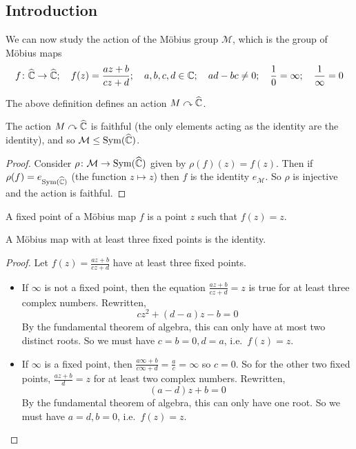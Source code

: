\subsection{Introduction}
We can now study the action of the M\"obius group \(\mathcal M\), which is the group of M\"obius maps
\[
	f\colon \widehat{\mathbb C} \to \widehat{\mathbb C};\quad f(z) = \frac{az+b}{cz+d};\quad a,b,c,d\in\mathbb C;\quad ad-bc\neq 0;\quad \frac{1}{0}=\infty;\quad\frac{1}{\infty}=0
\]
\begin{remark}
	The above definition defines an action \(M \curvearrowright \widehat{\mathbb C}\).
\end{remark}
\begin{proposition}
	The action \(M \curvearrowright \widehat{\mathbb C}\) is faithful (the only elements acting as the identity are the identity), and so \(\mathcal M \leq \operatorname{Sym}(\widehat{\mathbb C})\).
\end{proposition}
\begin{proof}
	Consider \(\rho\colon \mathcal M \to \operatorname{Sym}(\widehat{\mathbb C})\) given by \(\rho(f)(z) = f(z)\).
	Then if \(\rho(f) = e_{\operatorname{Sym}(\widehat{\mathbb C})}\) (the function \(z \mapsto z\)) then \(f\) is the identity \(e_{\mathcal M}\).
	So \(\rho\) is injective and the action is faithful.
\end{proof}
\begin{definition}
	A fixed point of a M\"obius map \(f\) is a point \(z\) such that \(f(z) = z\).
\end{definition}
\begin{theorem}
	A M\"obius map with at least three fixed points is the identity.
\end{theorem}
\begin{proof}
	Let \(f(z) = \frac{az+b}{cz+d}\) have at least three fixed points.
	\begin{itemize}
		\item If \(\infty\) is not a fixed point, then the equation \(\frac{az+b}{cz+d} = z\) is true for at least three complex numbers.
		      Rewritten,
		      \[
			      cz^2 + (d-a)z-b=0
		      \]
		      By the fundamental theorem of algebra, this can only have at most two distinct roots.
		      So we must have \(c=b=0, d=a\), i.e.\ \(f(z) = z\).
		\item If \(\infty\) is a fixed point, then \(\frac{a\infty + b}{c\infty + d} = \frac{a}{c} = \infty\) so \(c = 0\).
		      So for the other two fixed points, \(\frac{az+b}{d} = z\) for at least two complex numbers.
		      Rewritten,
		      \[
			      (a-d)z+b=0
		      \]
		      By the fundamental theorem of algebra, this can only have one root.
		      So we must have \(a=d,b=0\), i.e.\ \(f(z) = z\).
	\end{itemize}
\end{proof}
